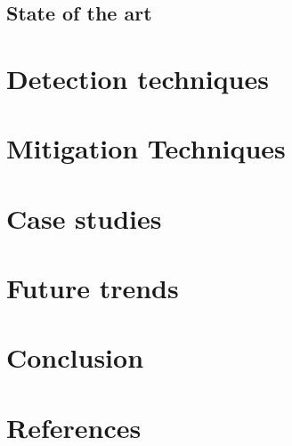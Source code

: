 \documentclass{article}
\begin{document}
\subsection{State of the art}
\begin{comment}
  Rise of the hypervizor exploits (showcase some virtualbox exploits, maybe
  vmware hyperv) RCE Exploits mostly slowing down Common techniques no longer
  being effective (check offbyonesec talk about windows kernel exploitation, talk
  about)
\end{comment}


\section{Detection techniques}%


\section{Mitigation Techniques}%


\section{Case studies}%


\section{Future trends}%


\section{Conclusion}%


\section{References}%
\end{document}
